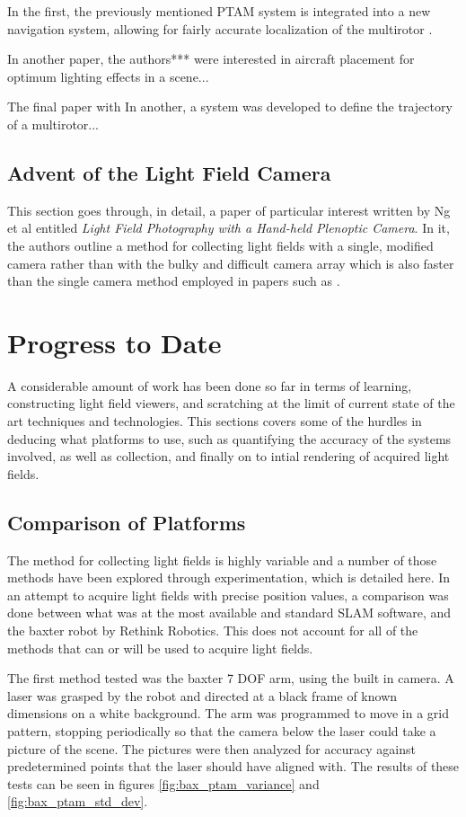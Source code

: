 \documentclass[12pt]{report}
\begin{document}
In the first, the previously mentioned PTAM system is integrated into a new navigation system, allowing for fairly accurate localization of the multirotor \cite{Engel12}.

In another paper, the authors*** were interested in aircraft placement for optimum lighting effects in a scene... \cite{Srikanth14}

The final paper with In another, a system was developed to define the trajectory of a multirotor... \cite{Roberts16}

\section*{Advent of the Light Field Camera}
This section goes through, in detail, a paper of particular interest written by Ng et al entitled \emph{Light Field Photography with a Hand-held Plenoptic Camera}. In it, the authors outline a method for collecting light fields with a single, modified camera rather than with the bulky and difficult camera array which is also faster than the single camera method employed in papers such as \cite{Davis12}.



\chapter*{Progress to Date}
A considerable amount of work has been done so far in terms of learning, constructing light field viewers, and scratching at the limit of current state of the art techniques and technologies. This sections covers some of the hurdles in deducing what platforms to use, such as quantifying the accuracy of the systems involved, as well as collection, and finally on to intial rendering of acquired light fields.

\section*{Comparison of Platforms}
The method for collecting light fields is highly variable and a number of those methods have been explored through experimentation, which is detailed here. In an attempt to acquire light fields with precise position values, a comparison was done between what was at the most available and standard SLAM software, and the baxter robot by Rethink Robotics. This does not account for all of the methods that can or will be used to acquire light fields.

The first method tested was the baxter 7 DOF arm, using the built in camera. A laser was grasped by the robot and directed at a black frame of known dimensions on a white background. The arm was programmed to move in a grid pattern, stopping periodically so that the camera below the laser could take a picture of the scene. The pictures were then analyzed for accuracy against predetermined points that the laser should have aligned with. The results of these tests can be seen in figures \ref{fig:bax_ptam_variance} and \ref{fig:bax_ptam_std_dev}.
\end{document}
